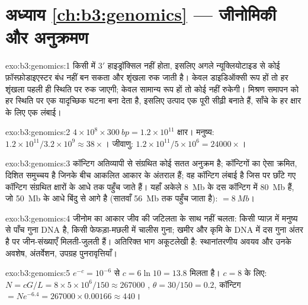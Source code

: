 \section*{अध्याय \ref{ch:b3:genomics} --- जीनोमिकी और अनुक्रमण}

\begin{solution}{exo:b3:genomics:1}
किसी  में 3$'$ हाइड्रॉक्सिल नहीं होता, इसलिए
अगले न्यूक्लियोटाइड से कोई फ़ॉस्फ़ोडाइएस्टर बंध नहीं बन सकता और शृंखला
रुक जाती है। केवल डाइडिऑक्सी रूप हों तो हर शृंखला पहली ही स्थिति पर रुक
जाएगी; केवल सामान्य रूप हों तो कोई नहीं रुकेगी। मिश्रण समापन को हर
स्थिति पर एक यादृच्छिक घटना बना देता है, इसलिए उत्पाद एक पूरी सीढ़ी
बनाते हैं, साँचे के हर क्षार के लिए एक लंबाई।
\end{solution}

\begin{solution}{exo:b3:genomics:2}
$4\times 10^{8}\times \qty{300}{bp} = 1.2\times 10^{11}$ क्षार। मनुष्य:
$1.2\times 10^{11}/3.2\times 10^{9} \approx 38\times$। जीवाणु:
$1.2\times 10^{11}/5\times 10^{6} = \num{24000}\times$।
\end{solution}

\begin{solution}{exo:b3:genomics:3}
कॉन्टिग अतिव्यापी  से संग्रथित कोई सतत अनुक्रम है; 
कॉन्टिगों का ऐसा क्रमित, दिशित समुच्चय है जिनके बीच आकलित आकार के
अंतराल हैं;  वह कॉन्टिग लंबाई है जिस पर छाँटे गए कॉन्टिग संग्रथित
क्षारों के आधे तक पहुँच जाते हैं। यहाँ अकेले \qty{8}{Mb} के दस कॉन्टिग
में \qty{80}{Mb} हैं, जो \qty{50}{Mb} के आधे बिंदु से आगे है (सातवाँ
\qty{56}{Mb} तक पहुँच जाता है):  $= \qty{8}{Mb}$।
\end{solution}

\begin{solution}{exo:b3:genomics:4}
जीनोम का आकार जीव की जटिलता के साथ नहीं चलता: किसी प्याज़ में मनुष्य से
पाँच गुना DNA है, किसी फेफड़ा-मछली में चालीस गुना; खमीर और कृमि के DNA
में दस गुना अंतर है पर जीन-संख्याएँ मिलती-जुलती हैं। अतिरिक्त भाग
अकूटलेखी है: स्थानांतरणीय अवयव और उनके अवशेष, अंतर्वेशन, उपग्रह
पुनरावृत्तियाँ।
\end{solution}

\begin{solution}{exo:b3:genomics:5}
$e^{-c} = 10^{-6}$ से $c = 6\ln 10 = 13.8$ मिलता है। $c = 8$ के लिए: $N =
cG/L = 8\times 5\times 10^{6}/150 \approx \num{267000}$ , $\theta
= 30/150 = 0.2$, कॉन्टिग $= N e^{-6.4} = \num{267000}\times 0.00166
\approx 440$।
\end{solution}

